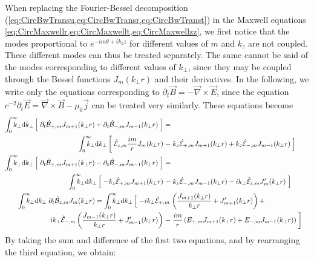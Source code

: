 When replacing the Fourier-Bessel decomposition
(\cref{eq:CircBwTransu,eq:CircBwTransr,eq:CircBwTranst}) in the
Maxwell equations \cref{eq:CircMaxwellr,eq:CircMaxwellt,eq:CircMaxwellzz}, we
first notice that the modes proportional to $e^{-im\theta +ik_z z}$ for different
values of $m$ and $k_z$ are not coupled. These different modes can
thus be treated separately. The same cannot be said of the modes
corresponding to different values of $k_\perp $, since they may be coupled
through the Bessel functions $J_m(k_\perp r)$ and their derivatives. 
In the following, we write only the equations corresponding to $\partial_t \vec{B} =
-\vec{\nabla}\times \vec{E}$, since the equation $c^{-2}\partial_t \vec{E} =
\vec{\nabla}\times\vec{B} - \mu_0 \vec{j}$ can be treated very
similarly. These equations become
\begin{align*}
\RInteg{k_\perp } \left[ \; \partial_t \spectral{B}_{+,m}  J_{m+1}(k_\perp r)
  + \partial_t \spectral{B}_{-,m}  J_{m-1}(k_\perp r) \; \right] =&& \\ 
\qquad \RInteg{k_\perp } \left[ \; \spectral{E}_{z,m} \frac{im}{r}
  J_m(k_\perp r) \right.-&\left.
  k_z\spectral{E}_{+,m}J_{m+1}(k_\perp r) + k_z\spectral{E}_{-,m}J_{m-1}(k_\perp r) \;
\right] & \\
\RInteg{k_\perp } \left[ \; \partial_t \spectral{B}_{+,m}  J_{m+1}(k_\perp r)
  - \partial_t \spectral{B}_{-,m}  J_{m-1}(k_\perp r) \; \right] =&& \\
 \RInteg{k_\perp } \left[ \; -k_z\spectral{E}_{+,m}J_{m+1}(k_\perp r)
 \right.-&\left.  k_z\spectral{E}_{-,m}J_{m-1}(k_\perp r) - ik_\perp \spectral{E}_{z,m} J_m'(k_\perp r) \;\right] \\
\RInteg{k_\perp }\; \partial_t \spectral{B}_{z,m}  J_{m}(k_\perp r) =
\RInteg{k_\perp } \left[ \; -ik_\perp
  \spectral{E}_{+,m}\right.&\left(\frac{J_{m+1}(k_\perp r)}{k_\perp r} +
    J_{m+1}'(k_\perp r) \right) + &\\
\left. ik_\perp \spectral{E}_{-,m}\left(\frac{J_{m-1}(k_\perp r)}{k_\perp r} +
    J_{m-1}'(k_\perp r) \right) \right.-&\left. \frac{im}{r} \left( E_{+,m} J_{m+1}(k_\perp r) +
    E_{-,m} J_{m-1}(k_\perp r) \right) \;\right] 
\end{align*}
By taking the sum and difference of the first two equations, and by
rearranging the third equation, we obtain:
